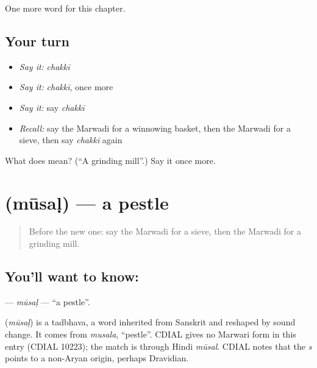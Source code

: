 \begin{grammarlens}[title={What you've built}]
One more word for this chapter.
\end{grammarlens}

\subsection*{Your turn}
\begin{itemize}
\raggedright
  \item \emph{Say it:} \emph{chakkī}
  \item \emph{Say it:} \emph{chakkī}, once more
  \item \emph{Say it:} say \emph{chakkī}
  \item \emph{Recall:} say the Marwadi for a winnowing basket, then the Marwadi for a sieve, then say \emph{chakkī} again
\end{itemize}

\begin{tcolorbox}[breakable,colback=teal!4,colframe=teal!35!black,title={Before you move on}]
What does  mean? (\textquotedblleft{}A grinding mill\textquotedblright{}.) Say it once more.
\end{tcolorbox}
\section[\texorpdfstring{\mw{मूसळ} (mūsaḷ)}{मूसळ (mūsaḷ)}]{ (mūsaḷ) — a pestle}

\label{lesson:MW-C120-musal}



\begin{quote}
Before the new one: say the Marwadi for a sieve, then the Marwadi for a grinding mill.
\end{quote}

\subsection*{You'll want to know: }
\textbf{} — \emph{mūsaḷ} — \textquotedblleft{}a pestle\textquotedblright{}.

\begin{cousinweb}
\textbf{} (\emph{mūsaḷ}) is a tadbhava, a word inherited from Sanskrit and reshaped by sound change. It comes from \emph{musala}, \textquotedblleft{}pestle\textquotedblright{}. CDIAL gives no Marwari form in this entry (CDIAL 10223); the match is through Hindi \emph{mūsal}. CDIAL notes that the \emph{s} points to a non-Aryan origin, perhaps Dravidian.
\end{cousinweb}

